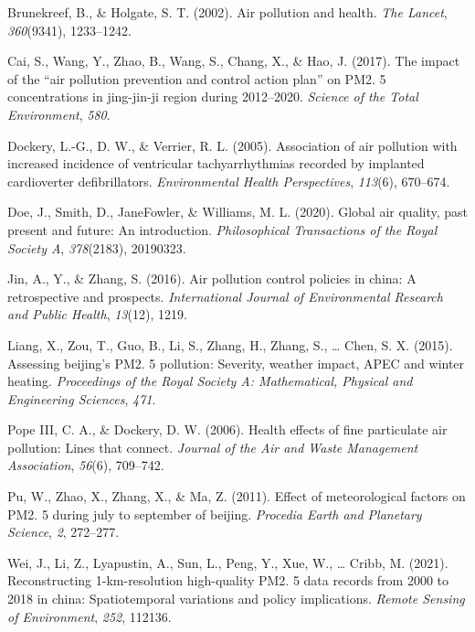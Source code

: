 \documentclass[
  12pt,
]{article}
\newlength{\cslhangindent}
\newlength{\cslentryspacingunit} %
\newenvironment{CSLReferences}[2] %
 {%
  \setlength{\parindent}{0pt}
  \ifodd #1
  \let\oldpar\par
  \def\par{\hangindent=\cslhangindent\oldpar}
  \fi
  \setlength{\parskip}{#2\cslentryspacingunit}
 }%
 {}
\begin{document}
\hypertarget{refs}{}
\begin{CSLReferences}{1}{0}
\leavevmode{}%
Brunekreef, B., \& Holgate, S. T. (2002). Air pollution and health.
\emph{The Lancet}, \emph{360}(9341), 1233--1242.

\leavevmode{}%
Cai, S., Wang, Y., Zhao, B., Wang, S., Chang, X., \& Hao, J. (2017). The
impact of the {``air pollution prevention and control action plan''} on
PM2. 5 concentrations in jing-jin-ji region during 2012--2020.
\emph{Science of the Total Environment}, \emph{580}.

\leavevmode{}%
Dockery, L.-G., D. W., \& Verrier, R. L. (2005). Association of air
pollution with increased incidence of ventricular tachyarrhythmias
recorded by implanted cardioverter defibrillators. \emph{Environmental
Health Perspectives}, \emph{113}(6), 670--674.

\leavevmode{}%
Doe, J., Smith, D., JaneFowler, \& Williams, M. L. (2020). Global air
quality, past present and future: An introduction. \emph{Philosophical
Transactions of the Royal Society A}, \emph{378}(2183), 20190323.

\leavevmode{}%
Jin, A., Y., \& Zhang, S. (2016). Air pollution control policies in
china: A retrospective and prospects. \emph{International Journal of
Environmental Research and Public Health}, \emph{13}(12), 1219.

\leavevmode{}%
Liang, X., Zou, T., Guo, B., Li, S., Zhang, H., Zhang, S., \ldots{}
Chen, S. X. (2015). Assessing beijing's PM2. 5 pollution: Severity,
weather impact, APEC and winter heating. \emph{Proceedings of the Royal
Society A: Mathematical, Physical and Engineering Sciences}, \emph{471}.

\leavevmode{}%
Pope III, C. A., \& Dockery, D. W. (2006). Health effects of fine
particulate air pollution: Lines that connect. \emph{Journal of the Air
and Waste Management Association}, \emph{56}(6), 709--742.

\leavevmode{}%
Pu, W., Zhao, X., Zhang, X., \& Ma, Z. (2011). Effect of meteorological
factors on PM2. 5 during july to september of beijing. \emph{Procedia
Earth and Planetary Science}, \emph{2}, 272--277.

\leavevmode{}%
Wei, J., Li, Z., Lyapustin, A., Sun, L., Peng, Y., Xue, W., \ldots{}
Cribb, M. (2021). Reconstructing 1-km-resolution high-quality PM2. 5
data records from 2000 to 2018 in china: Spatiotemporal variations and
policy implications. \emph{Remote Sensing of Environment}, \emph{252},
112136.

\end{CSLReferences}
\end{document}
